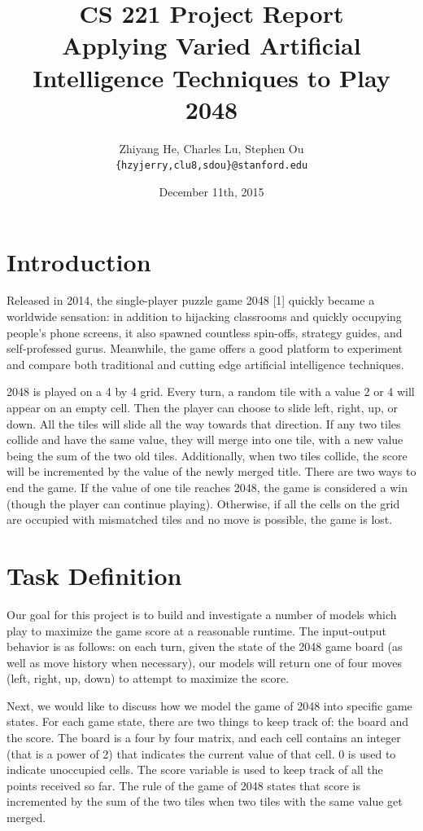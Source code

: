 \documentclass[9pt,twocolumn]{article}
\title{CS 221 Project Report \\ Applying Varied Artificial Intelligence Techniques to Play 2048}
\author{Zhiyang He, Charles Lu, Stephen Ou \\ \texttt{\{hzyjerry,clu8,sdou\}@stanford.edu}}
\date{December 11th, 2015}
\begin{document}
\maketitle

\section{Introduction}

Released in 2014, the single-player puzzle game 2048 [1] quickly became a worldwide sensation: in addition to hijacking classrooms and quickly occupying people's phone screens, it also spawned countless spin-offs, strategy guides, and self-professed gurus. Meanwhile, the game offers a good platform to experiment and compare both traditional and cutting edge artificial intelligence techniques.

2048 is played on a 4 by 4 grid. Every turn, a random tile with a value 2 or 4 will appear on an empty cell. Then the player can choose to slide left, right, up, or down. All the tiles will slide all the way towards that direction. If any two tiles collide and have the same value, they will merge into one tile, with a new value being the sum of the two old tiles. Additionally, when two tiles collide, the score will be incremented by the value of the newly merged title. There are two ways to end the game. If the value of one tile reaches 2048, the game is considered a win (though the player can continue playing). Otherwise, if all the cells on the grid are occupied with mismatched tiles and no move is possible, the game is lost.

\section{Task Definition}

Our goal for this project is to build and investigate a number of models which play to maximize the game score at a reasonable runtime. The input-output behavior is as follows: on each turn, given the state of the 2048 game board (as well as move history when necessary), our models will return one of four moves (left, right, up, down) to attempt to maximize the score.

Next, we would like to discuss how we model the game of 2048 into specific game states. For each game state, there are two things to keep track of: the board and the score. The board is a four by four matrix, and each cell contains an integer (that is a power of 2) that indicates the current value of that cell. 0 is used to indicate unoccupied cells. The score variable is used to keep track of all the points received so far. The rule of the game of 2048 states that score is incremented by the sum of the two tiles when two tiles with the same value get merged.
\end{document}

